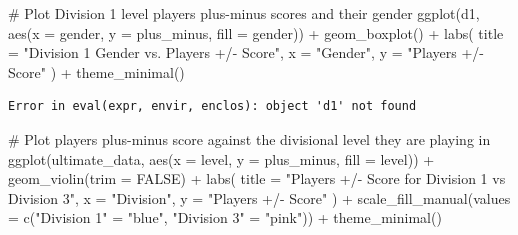 \documentclass[
  letterpaper,
  DIV=11,
  numbers=noendperiod]{scrartcl}
\newenvironment{Shaded}{\begin{snugshade}}{\end{snugshade}}
\newcommand{\AttributeTok}[1]{\textcolor[rgb]{0.40,0.45,0.13}{#1}}
\newcommand{\CommentTok}[1]{\textcolor[rgb]{0.37,0.37,0.37}{#1}}
\newcommand{\ConstantTok}[1]{\textcolor[rgb]{0.56,0.35,0.01}{#1}}
\newcommand{\FunctionTok}[1]{\textcolor[rgb]{0.28,0.35,0.67}{#1}}
\newcommand{\NormalTok}[1]{\textcolor[rgb]{0.00,0.23,0.31}{#1}}
\newcommand{\OtherTok}[1]{\textcolor[rgb]{0.00,0.23,0.31}{#1}}
\newcommand{\SpecialCharTok}[1]{\textcolor[rgb]{0.37,0.37,0.37}{#1}}
\newcommand{\StringTok}[1]{\textcolor[rgb]{0.13,0.47,0.30}{#1}}
\begin{document}
\begin{Shaded}
\begin{Highlighting}[]
\CommentTok{\# Plot  Division 1 level player\textquotesingle{}s plus{-}minus scores and their gender}
\FunctionTok{ggplot}\NormalTok{(d1, }\FunctionTok{aes}\NormalTok{(}\AttributeTok{x =}\NormalTok{ gender, }\AttributeTok{y =}\NormalTok{ plus\_minus, }\AttributeTok{fill =}\NormalTok{ gender)) }\SpecialCharTok{+}
  \FunctionTok{geom\_boxplot}\NormalTok{() }\SpecialCharTok{+}
  \FunctionTok{labs}\NormalTok{(}
    \AttributeTok{title =} \StringTok{"Division 1 Gender vs. Player\textquotesingle{}s +/{-} Score"}\NormalTok{,}
    \AttributeTok{x =} \StringTok{"Gender"}\NormalTok{,}
    \AttributeTok{y =} \StringTok{"Player\textquotesingle{}s +/{-} Score"}
\NormalTok{  ) }\SpecialCharTok{+}
  \FunctionTok{theme\_minimal}\NormalTok{()}
\end{Highlighting}
\end{Shaded}

\begin{verbatim}
Error in eval(expr, envir, enclos): object 'd1' not found
\end{verbatim}

\begin{Shaded}
\begin{Highlighting}[]
\CommentTok{\# Plot player\textquotesingle{}s plus{-}minus score against the divisional level they are playing in}
\FunctionTok{ggplot}\NormalTok{(ultimate\_data, }\FunctionTok{aes}\NormalTok{(}\AttributeTok{x =}\NormalTok{ level, }\AttributeTok{y =}\NormalTok{ plus\_minus, }\AttributeTok{fill =}\NormalTok{ level)) }\SpecialCharTok{+}
  \FunctionTok{geom\_violin}\NormalTok{(}\AttributeTok{trim =} \ConstantTok{FALSE}\NormalTok{) }\SpecialCharTok{+}
  \FunctionTok{labs}\NormalTok{(}
    \AttributeTok{title =} \StringTok{"Player\textquotesingle{}s +/{-} Score for Division 1 vs Division 3"}\NormalTok{,}
    \AttributeTok{x =} \StringTok{"Division"}\NormalTok{,}
    \AttributeTok{y =} \StringTok{"Player\textquotesingle{}s +/{-} Score"}
\NormalTok{  ) }\SpecialCharTok{+}
  \FunctionTok{scale\_fill\_manual}\NormalTok{(}\AttributeTok{values =} \FunctionTok{c}\NormalTok{(}\StringTok{"Division 1"} \OtherTok{=} \StringTok{"blue"}\NormalTok{, }\StringTok{"Division 3"} \OtherTok{=} \StringTok{"pink"}\NormalTok{)) }\SpecialCharTok{+} 
  \FunctionTok{theme\_minimal}\NormalTok{()}
\end{Highlighting}
\end{Shaded}
\end{document}
